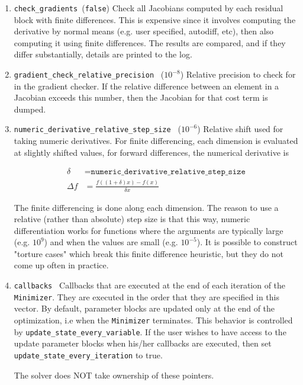 \begin{enumerate}
\item{\texttt{check\_gradients }}(\texttt{false})
 Check all Jacobians computed by each residual block with finite
     differences. This is expensive since it involves computing the
     derivative by normal means (e.g. user specified, autodiff,
     etc), then also computing it using finite differences. The
     results are compared, and if they differ substantially, details
     are printed to the log.

\item{\texttt{gradient\_check\_relative\_precision }} ($10^{-8}$)
  Relative precision to check for in the gradient checker. If the
  relative difference between an element in a Jacobian exceeds
  this number, then the Jacobian for that cost term is dumped.

\item{\texttt{numeric\_derivative\_relative\_step\_size }} ($10^{-6}$)
 Relative shift used for taking numeric derivatives. For finite
     differencing, each dimension is evaluated at slightly shifted
     values, \eg for forward differences, the numerical derivative is

\begin{align}
 \delta &= \texttt{numeric\_derivative\_relative\_step\_size}\\
 \Delta f &= \frac{f((1 + \delta)  x) - f(x)}{\delta x}
\end{align}

The finite differencing is done along each dimension. The
reason to use a relative (rather than absolute) step size is
that this way, numeric differentiation works for functions where
the arguments are typically large (e.g. $10^9$) and when the
values are small (e.g. $10^{-5}$). It is possible to construct
"torture cases" which break this finite difference heuristic,
but they do not come up often in practice.

\item{\texttt{callbacks }}
  Callbacks that are executed at the end of each iteration of the
\texttt{Minimizer}. They are executed in the order that they are
specified in this vector. By default, parameter blocks are
updated only at the end of the optimization, i.e when the
\texttt{Minimizer} terminates. This behavior is controlled by
\texttt{update\_state\_every\_variable}. If the user wishes to have access
to the update parameter blocks when his/her callbacks are
executed, then set \texttt{update\_state\_every\_iteration} to true.

The solver does NOT take ownership of these pointers.


\end{enumerate}
